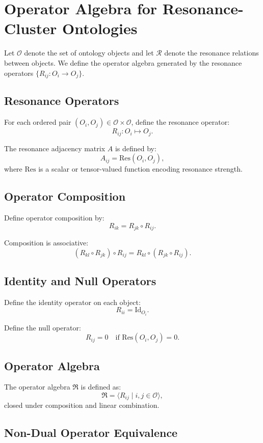 \section{Operator Algebra for Resonance-Cluster Ontologies}

Let $\mathcal{O}$ denote the set of ontology objects and let
$\mathcal{R}$ denote the resonance relations between objects. We define
the operator algebra generated by the resonance operators
$\{ R_{ij} : O_i \to O_j \}$.

\subsection{Resonance Operators}

For each ordered pair $(O_i, O_j) \in \mathcal{O} \times \mathcal{O}$,
define the resonance operator:
\[
R_{ij} : O_i \mapsto O_j.
\]

The resonance adjacency matrix $A$ is defined by:
\[
A_{ij} = \mathrm{Res}(O_i, O_j),
\]
where $\mathrm{Res}$ is a scalar or tensor-valued function encoding
resonance strength.

\subsection{Operator Composition}

Define operator composition by:
\[
R_{ik} = R_{jk} \circ R_{ij}.
\]

Composition is associative:
\[
(R_{kl} \circ R_{jk}) \circ R_{ij}
  = R_{kl} \circ (R_{jk} \circ R_{ij}).
\]

\subsection{Identity and Null Operators}

Define the identity operator on each object:
\[
R_{ii} = \mathrm{Id}_{O_i}.
\]

Define the null operator:
\[
R_{ij} = 0 \quad \text{if } \mathrm{Res}(O_i, O_j) = 0.
\]

\subsection{Operator Algebra}

The operator algebra $\mathfrak{R}$ is defined as:
\[
\mathfrak{R} = \langle R_{ij} \mid i,j \in \mathcal{O} \rangle,
\]
closed under composition and linear combination.

\subsection{Non-Dual Operator Equivalence}

